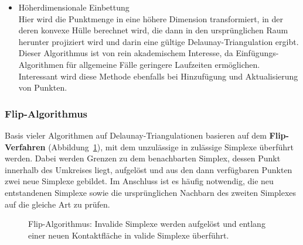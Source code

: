 \begin{itemize}
\item Höherdimensionale Einbettung\\
  Hier wird die Punktmenge in eine höhere Dimension transformiert, in der deren konvexe Hülle berechnet wird, die dann in den ursprünglichen Raum herunter projiziert wird und darin eine gültige Delaunay-Triangulation ergibt.
  Dieser Algorithmus ist von rein akademischem Interesse, da Einfügungs-Algorithmen für allgemeine Fälle geringere Laufzeiten ermöglichen.
  Interessant wird diese Methode ebenfalls bei Hinzufügung und Aktualisierung von Punkten.

\end{itemize}

\subsubsection{Flip-Algorithmus}

Basis vieler Algorithmen auf Delaunay-Triangulationen basieren auf dem \textbf{Flip-Verfahren} (Abbildung~\ref{fig:delaunay-flip}), mit dem unzulässige in zulässige Simplexe überführt werden.
Dabei werden Grenzen zu dem benachbarten Simplex, dessen Punkt innerhalb des Umkreises liegt, aufgelöst und aus den dann verfügbaren Punkten zwei neue Simplexe gebildet.
Im Anschluss ist es häufig notwendig, die neu entstandenen Simplexe sowie die ursprünglichen Nachbarn des zweiten Simplexes auf die gleiche Art zu prüfen.

\begin{figure}[!ht]
  \caption[Flip-Algorithmus für Delaunay-Triangulationen]{
    Flip-Algorithmus: Invalide Simplexe werden aufgelöst und entlang einer neuen Kontaktfläche in valide Simplexe überführt.
  }
  \label{fig:delaunay-flip}
\end{figure}
